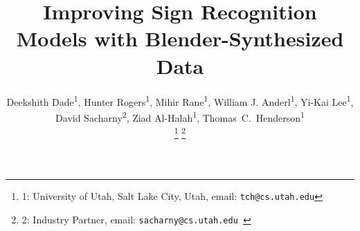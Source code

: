 \documentclass[journal]{IEEEtran}
\begin{document}
%
\title{Improving Sign Recognition Models with Blender-Synthesized Data}
%
%
%

\author{
    Deekshith Dade\textsuperscript{1},
    Hunter Rogers\textsuperscript{1},
    Mihir Rane\textsuperscript{1},
    William J. Anderl\textsuperscript{1},
    Yi-Kai Lee\textsuperscript{1},
    David Sacharny\textsuperscript{2},
    Ziad Al-Halah\textsuperscript{1},
    Thomas~C.~Henderson\textsuperscript{1}
    
    \thanks{1: University of Utah, Salt Lake City, Utah, email: \tt\small tch@cs.utah.edu}
    \thanks{2: Industry Partner, email: \tt\small sacharny@cs.utah.edu }
}



% 
%
\end{document}
